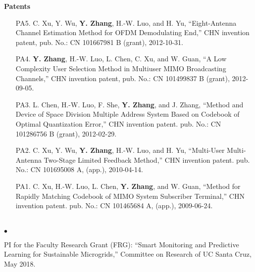 \documentclass[margin,line]{res}
\newenvironment{list2}{
  \begin{list}{$\bullet$}{%
      \setlength{\itemsep}{0in}
      \setlength{\parsep}{0in} \setlength{\parskip}{0in}
      \setlength{\topsep}{0in} \setlength{\partopsep}{0in}
      \setlength{\leftmargin}{0.10in}}}{\end{list}}
\begin{document}
\begin{resume}
\vspace{.2cm}




{\bf Patents}

\vspace{.2cm}

\begin{enumerate}


\item[PA5.] C. Xu, Y. Wu, \textbf{Y. Zhang}, H.-W. Luo, and H. Yu,
``Eight-Antenna Channel Estimation Method for OFDM Demodulating End,'' CHN invention patent,
pub. No.: CN 101667981 B (grant), 2012-10-31.

\item[PA4.] \textbf{Y. Zhang}, H.-W. Luo, L. Chen, C. Xu, and W. Guan,
``A Low Complexity User Selection Method in Multiuser MIMO Broadcasting Channels,'' CHN invention patent,
pub. No.: CN 101499837 B (grant), 2012-09-05.


\item[PA3.] L. Chen, H.-W. Luo, F. She, \textbf{Y. Zhang}, and J. Zhang,
``Method and Device of Space Division Multiple Address System Based on Codebook
of Optimal Quantization Error,'' CHN invention patent.
pub. No.: CN 101286756 B (grant), 2012-02-29.


\item[PA2.] C. Xu, Y. Wu, \textbf{Y. Zhang}, H.-W. Luo, and H. Yu,
``Multi-User Multi-Antenna Two-Stage Limited Feedback Method,'' CHN invention patent.
pub. No.: CN 101695008 A, (app.), 2010-04-14.


\item[PA1.] C. Xu, H.-W. Luo, L. Chen, \textbf{Y. Zhang}, and W. Guan,
``Method for Rapidly Matching Codebook of MIMO System Subscriber Terminal,'' CHN invention patent.
pub. No.: CN 101465684 A, (app.), 2009-06-24.


\end{enumerate}

\vspace{.3cm}


\section{}
\begin{list2}

\item  PI for the Faculty Research Grant (FRG): ``Smart Monitoring and Predictive Learning for Sustainable Microgrids,'' Committee on Research of UC Santa Cruz, May 2018.


\end{list2}
\end{resume}
\end{document}
